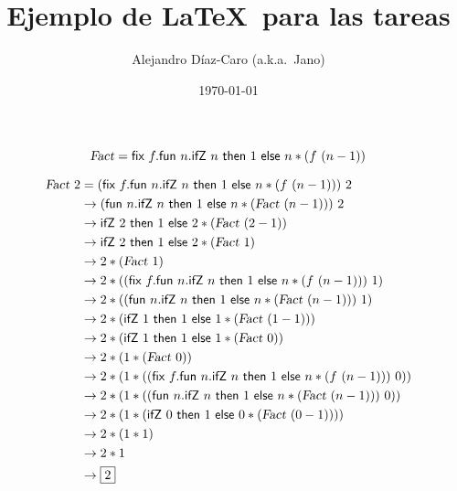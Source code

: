 \documentclass[a4paper,10pt]{article} %
\title{Ejemplo de \LaTeX\ para las tareas}
\author{Alejandro Díaz-Caro (a.k.a.~Jano)}
\date{\today}  %
\newcommand\fun{\textsf{fun}~}  %
\newcommand\fix{\textsf{fix}~}
\newcommand\ifZ{\textsf{ifZ}~}
\newcommand\Then{~\textsf{then}~} %
\newcommand\Else{~\textsf{else}~} %
\begin{document}
\maketitle   %

\[
  \textsl{Fact} = \fix f.\fun n.\ifZ n \Then 1 \Else n*(f\ (n-1))
\]


\begin{align*}
  \textsl{Fact}~2
  & = (\fix f.\fun n.\ifZ n \Then 1 \Else n*(f\ (n-1)))~2\\
  & \to (\fun n.\ifZ n\Then 1\Else n*(\textsl{Fact}\ (n-1)))~2\\
  & \to \ifZ 2\Then 1\Else 2*(\textsl{Fact}\ (2-1))\\
  & \to \ifZ 2\Then 1\Else 2*(\textsl{Fact}\ 1)\\
  & \to 2*(\textsl{Fact}\ 1)\\
  & \to 2*((\fix f.\fun n.\ifZ n \Then 1 \Else n*(f\ (n-1)))\ 1)\\
  & \to 2*((\fun n.\ifZ n \Then 1 \Else n*(\textsl{Fact}\ (n-1)))\ 1)\\
  & \to 2*(\ifZ 1 \Then 1 \Else 1*(\textsl{Fact}\ (1-1)))\\
  & \to 2*(\ifZ 1 \Then 1 \Else 1*(\textsl{Fact}\ 0))\\
  & \to 2*(1*(\textsl{Fact}\ 0))\\
  & \to 2*(1*((\fix f.\fun n.\ifZ n \Then 1 \Else n*(f\ (n-1)))\ 0))\\
  & \to 2*(1*((\fun n.\ifZ n \Then 1 \Else n*(\textsl{Fact}\ (n-1)))\ 0))\\
  & \to 2*(1*(\ifZ 0 \Then 1 \Else 0*(\textsl{Fact}\ (0-1))))\\
  & \to 2*(1*1)\\
  & \to 2*1\\
  & \to\fbox{2}\\
\end{align*}
\end{document}
